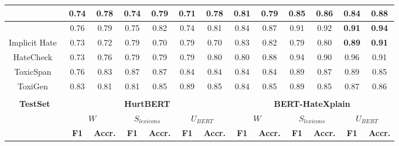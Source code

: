 \begin{table*}[ht]
\begin{tabular}{||c|c|c|c|c|c|c||c|c|c|c|c|c||}
\citeauthor{davidson2017automated}\cite{davidson2017automated} & 0.74 & 0.78 & 0.74 & 0.79 & 0.71 & 0.78 
                             & 0.81 & 0.79 & 0.85 & 0.86 & \textbf{0.84} & \textbf{0.88} \\ \hline
                             
\citeauthor{founta2018large}\cite{founta2018large} & 0.76 & 0.79 & 0.75 & 0.82 & 0.74 & 0.81
                       & 0.84 & 0.87 & 0.91 & 0.92 & \textbf{0.91} & \textbf{0.94} \\ \hline
                       
Implicit Hate~\cite{elsherief-etal-2021-latent} & 0.73 & 0.72 & 0.79 & 0.70 & 0.79 & 0.70 
                                                & 0.83 & 0.82 & 0.79 & 0.80 & \textbf{0.89} & \textbf{0.91} \\ \hline
                                                
HateCheck~\cite{rottger-etal-2021-hatecheck} & 0.73 & 0.76 & 0.79 & 0.79 & 0.79 & 0.80
                                             & 0.80 & 0.88 & 0.94 & 0.90 & 0.96 & 0.91 \\ \hline
                                             
ToxicSpan~\cite{pavlopoulos-etal-2022-acl} & 0.76 & 0.83 & 0.87 & 0.87 & 0.84 & 0.84 
                                           & 0.84 & 0.84 & 0.89 & 0.87 & 0.89 & 0.85 \\ \hline
                                           
ToxiGen~\cite{hartvigsen-etal-2022-toxigen} & 0.83 & 0.81 & 0.81 & 0.85 & 0.89 & 0.85 
                                            & 0.84 & 0.85 & 0.89 & 0.85 & 0.87 & 0.86 \\ \hline

\multicolumn{13}{c}{} \\ \hline
\multirow{3}{*}{\textbf{TestSet}} & \multicolumn{6}{c||}{\textbf{HurtBERT}} & \multicolumn{6}{c||}{\textbf{BERT-HateXplain}} \\ \cline{2-13} 
 & \multicolumn{2}{c|}{$W$} & \multicolumn{2}{c|}{$S_{lexicons}$} & \multicolumn{2}{c||}{$U_{BERT}$} & \multicolumn{2}{c|}{$W$} & \multicolumn{2}{c|}{$S_{lexicons}$} & \multicolumn{2}{c||}{$U_{BERT}$} \\ \cline{2-13}
 & \textbf{F1} & \textbf{Accr.} & \textbf{F1} & \textbf{Accr.} & \textbf{F1} & \textbf{Accr.} & \textbf{F1} & \textbf{Accr.} & \textbf{F1} & \textbf{Accr.} & \textbf{F1} & \textbf{Accr.} \\ \hline
 

\end{tabular}
\end{table*}
